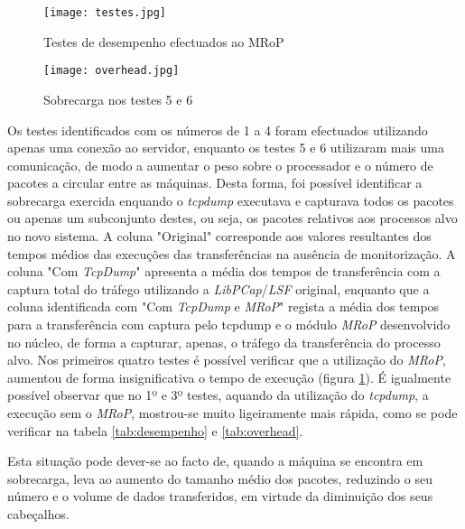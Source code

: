 \begin{figure}[!ht]
\centering
\texttt{[image: testes.jpg]}
\caption{Testes de desempenho efectuados ao MRoP}
\label{fig:tests_graphics}
\end{figure}

\begin{figure}[!ht]
\centering
\texttt{[image: overhead.jpg]}
\caption{Sobrecarga nos testes 5 e 6 }
\label{fig:tests_overhead}
\end{figure}

Os testes identificados com os números de 1 a 4 foram efectuados utilizando apenas uma conexão ao servidor, enquanto os testes 5 e 6 utilizaram mais uma comunicação, de modo a aumentar o peso sobre o processador e o número de pacotes a circular entre as máquinas.
Desta forma, foi possível identificar a sobrecarga exercida enquando o \textit{tcpdump} executava e capturava todos os pacotes ou apenas um subconjunto destes, ou seja, os pacotes relativos aos processos alvo no novo sistema.
A coluna "Original" corresponde aos valores resultantes dos tempos médios das execuções das transferências na ausência de monitorização.
A coluna "Com \textit{TcpDump}" apresenta a média dos tempos de transferência com a captura total do tráfego utilizando a \textit{LibPCap}/\textit{LSF} original, enquanto que a coluna identificada com "Com \textit{TcpDump} e \textit{MRoP}" regista a média dos tempos para a transferência com captura pelo tcpdump e o módulo \textit{MRoP} desenvolvido no núcleo, de forma a capturar, apenas, o tráfego da transferência do processo alvo.
Nos primeiros quatro testes é possível verificar que a utilização do \textit{MRoP}, aumentou de forma insignificativa o tempo de execução (figura \ref{fig:tests_graphics}).
É igualmente possível observar que no 1º e 3º testes, aquando da utilização do \textit{tcpdump}, a execução sem o \textit{MRoP}, mostrou-se muito ligeiramente mais rápida, como se pode verificar na tabela \ref{tab:desempenho} e \ref{tab:overhead}.


Esta situação pode dever-se ao facto de, quando a máquina se encontra em sobrecarga, leva ao aumento do tamanho médio dos pacotes, reduzindo o seu número e o volume de dados transferidos, em virtude da diminuição dos seus cabeçalhos.

